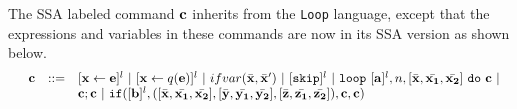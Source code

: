 The SSA labeled command ${\bf{{c}}}$ inherits from the {\tt Loop} language, except that the expressions and variables in these commands are now in its SSA version as shown below. 
\[
\begin{array}{llll}
 & \ssa{c} & ::= &   [\assign {\ssa{x}}{ \ssa{\expr}}]^{l} ~|~  [\assign {{\ssa{x}} } {q({\ssa{e}})}]^{l}
%
~|~  {{ifvar(\bar{\ssa{x}}, \bar{\ssa{x}}')}}  ~|~ [\eskip]^{l}  ~|~
 \eloop ~ [{\ssa{\aexpr}}]^{l}, {n},  [\bar{\ssa{x}}, \bar{\ssa{x_1}}, \bar{\ssa{x_2}}] ~ \edo ~ {\ssa{c}}  ~|~ \\ &&& \ssa{c};\ssa{c}  ~|~  \eif([\ssa{\bexpr}]^{l}, ([\bar{\ssa{x}}, \bar{\ssa{x_1}}, \bar{\ssa{x_2}}] , [\bar{\ssa{y}}, \bar{\ssa{y_1}}, \bar{\ssa{y_2}}],[\bar{\ssa{z}}, \bar{\ssa{z_1}}, \bar{\ssa{z_2}}] ) , \ssa{c}, \ssa{c}) 	
	\\
%
\end{array}
\]
